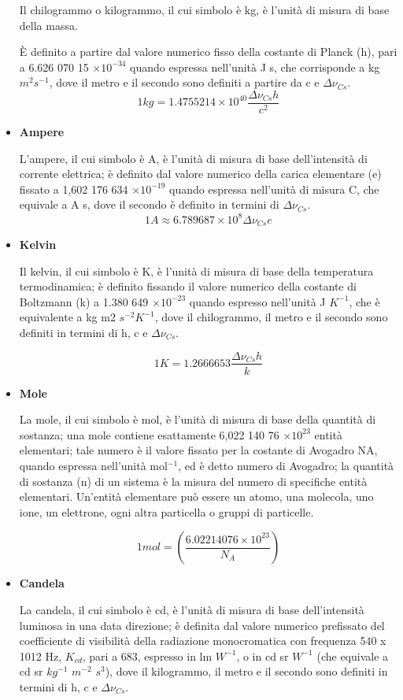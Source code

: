 \documentclass[a4paper, 15pt]{article}
\begin{document}
\begin{adjustwidth}{2in}{}
\begin{itemize}
		Il chilogrammo o kilogrammo, il cui simbolo è kg, è l’unità di misura di base della massa.
		
		È definito a partire dal valore numerico fisso della costante di Planck (h), pari a 6.626 070 15 $\times10^{-34}$  quando espressa nell'unità J s, che corrisponde a kg $m^2 s^{-1}$, dove il metro e il secondo sono definiti a partire da c e $\Delta\nu_{Cs}$.
		\[ 1kg = 1.475 521 4 \times 10^{40} \dfrac{\Delta\nu_{Cs}h}{c^2}\]
		
		\item \textbf{Ampere} 
		
		L'ampere, il cui simbolo è A, è l'unità di misura di base dell'intensità di corrente elettrica; è definito dal valore numerico della carica elementare (e) fissato a 1,602 176 634 $\times 10^{-19}$ quando espressa nell'unità di misura C, che equivale a A s, dove il secondo è definito in termini di $\Delta\nu_{Cs}$. 
		\[ 1 A \approx 6.789 687 \times 10^8 \Delta\nu_{Cs}e\]
		
		\item \textbf{Kelvin} 
		
		Il kelvin, il cui simbolo è K, è l’unità di misura di base della temperatura termodinamica; è definito fissando il valore numerico della costante di Boltzmann (k) a 1.380 649 $\times 10^{-23}$ quando espresso nell’unità J $K^{-1}$, che è equivalente a kg m2 $s^{-2} K^{-1}$, dove il chilogrammo, il metro e il secondo sono definiti in termini di h, c e $\Delta\nu_{Cs}$.
		
		\[ 1K = 1.266 665 3 \dfrac{\Delta\nu_{Cs}h}{k}\]
		
		\item \textbf{Mole} 
		
		La mole, il cui simbolo è mol, è l’unità di misura di base della quantità di sostanza; una mole contiene esattamente 6,022 140 76 $\times 10^{23}$ entità elementari; tale numero è il valore fissato per la costante di Avogadro NA, quando espressa nell’unità mol$^{-1}$, ed è detto numero di Avogadro; la quantità di sostanza (n) di un sistema è la misura del numero di specifiche entità elementari. Un’entità elementare può essere un atomo, una molecola, uno ione, un elettrone, ogni altra particella o gruppi di particelle.
		
		\[ 1mol = \left( \dfrac{6.022 140 76 \times 10^{23}}{N_A} \right) \]
		
		\item \textbf{Candela} 
		
		La candela, il cui simbolo è cd, è l'unità di misura di base dell'intensità luminosa in una data direzione; è definita dal valore numerico prefissato del coefficiente di visibilità della radiazione monocromatica con frequenza 540 x 1012 Hz, $K_{cd}$, pari a 683, espresso in lm $W^{-1}$, o in cd sr $W^{-1}$ (che equivale a cd sr $kg^{-1}$ $m^{-2}$ $s^3$), dove il kilogrammo, il metro e il secondo sono definiti in termini di h, c  e $\Delta\nu_{Cs}$.		
	\end{itemize}
	

\end{adjustwidth}
\end{document}
